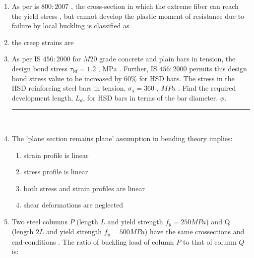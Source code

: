 \documentclass[journal]{IEEEtran}
\begin{document}
\begin{enumerate}
\begin{enumerate}
\end{enumerate}
\item As per is $800:2007$ , the cross-section in which the extreme fiber can reach the yield stress , but cannot develop the plastic moment of resistance due to failure by local buckling is classified as
\begin{enumerate}
\end{enumerate}
\item the creep strains are 
\begin{enumerate}
\end{enumerate}
\item As per IS $456:2000$ for $M20$ grade concrete and plain bars in tension, the design bond stress $\tau_{bd} = 1.2 $ , $\text{MPa}$ . Further, IS $456:2000$ permits this design bond stress value to be increased by $60\%$ for HSD bars. The stress in the HSD reinforcing steel bars in tension, $\sigma_s = 360$ ,
$MPa$ . Find the required development length, $L_d$, for HSD bars in terms of the bar diameter, $\phi$. \rule{2cm}{0.4pt} \\
\item The 'plane section remains plane' assumption in bending theory implies: 
\begin{enumerate}
\item strain profile is linear 
\item stress profile is linear
\item both stress and strain profiles are linear 
\item shear deformations are neglected
\end{enumerate}
\item Two steel columns $P$ (length $L$ and yield strength $f_y = 250MPa$) and Q (length $2L$ and yield strength $f_y = 500MPa$) have the same crossections and end-conditions . The ratio of buckling load of column $P$ to that of column $Q$ is: 

\end{enumerate}
\end{document}
